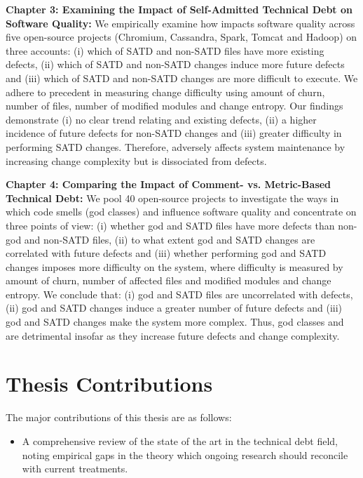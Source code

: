 \textbf{Chapter 3: Examining the Impact of Self-Admitted Technical Debt on Software Quality:} We empirically examine how \SATD impacts software quality across five open-source projects (Chromium, Cassandra, Spark, Tomcat and Hadoop) on three accounts: (i) which of SATD and non-SATD files have more existing defects, (ii) which of SATD and non-SATD changes induce more future defects and (iii) which of SATD and non-SATD changes are more difficult to execute. We adhere to precedent in measuring change difficulty using amount of churn, number of files, number of modified modules and change entropy. Our findings demonstrate (i) no clear trend relating \SATD and existing defects, (ii) a higher incidence of future defects for non-SATD changes and (iii) greater difficulty in performing SATD changes. Therefore, \SATD adversely affects system maintenance by increasing change complexity but is dissociated from defects.

\textbf{Chapter 4: Comparing the Impact of Comment- vs. Metric-Based Technical Debt:} We pool 40 open-source projects to investigate the ways in which code smells (god classes) and \SATD influence software quality and concentrate on three points of view: (i) whether god and SATD files have more defects than non-god and non-SATD files, (ii) to what extent god and SATD changes are correlated with future defects and (iii) whether performing god and SATD changes imposes more difficulty on the system, where difficulty is measured by amount of churn, number of affected files and modified modules and change entropy. We conclude that: (i) god and SATD files are uncorrelated with defects, (ii) god and SATD changes induce a greater number of future defects and (iii) god and SATD changes make the system more complex. Thus, god classes and \SATD are detrimental insofar as they increase future defects and change complexity.

\section{Thesis Contributions}
The major contributions of this thesis are as follows:
\begin{itemize}
	\item A comprehensive review of the state of the art in the technical debt field, noting empirical gaps in the theory which ongoing research should reconcile with current treatments.
	
\end{itemize}
